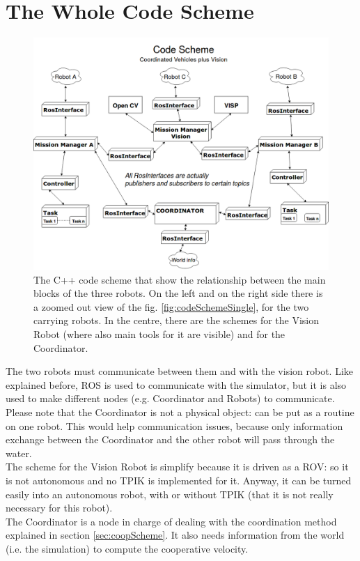 \section{The Whole Code Scheme}
\begin{figure}[H]
	\begin{center}
		\includegraphics[width=1\columnwidth]{CodeScheme.png}
		\caption[C++ Code Scheme for the whole architecture]{The C++ code scheme that show the relationship between the main blocks of the three robots. On the left and on the right side there is a zoomed out view of the fig. \ref{fig:codeSchemeSingle}, for the two carrying robots. In the centre, there are the schemes for the Vision Robot (where also main tools for it are visible) and for the Coordinator.}
		\label{fig:codeSchemeWhole}
	\end{center}
\end{figure}
	
The two robots must communicate between them and with the vision robot. Like explained before, ROS is used to communicate with the simulator, but it is also used to make different nodes (e.g. Coordinator and Robots) to communicate.\\
Please note that the Coordinator is not a physical object: can be put as a routine on one robot. This would help communication issues, because only information exchange between the Coordinator and the other robot will pass through the water.\\
The scheme for the Vision Robot is simplify because it is driven as a ROV: so it is not autonomous and no TPIK is implemented for it. Anyway, it can be turned easily into an autonomous robot, with or without TPIK (that it is not really necessary for this robot).\\
The Coordinator is a node in charge of dealing with the coordination method explained in section \ref{sec:coopScheme}. It also needs information from the world (i.e. the simulation) to compute the cooperative velocity.
